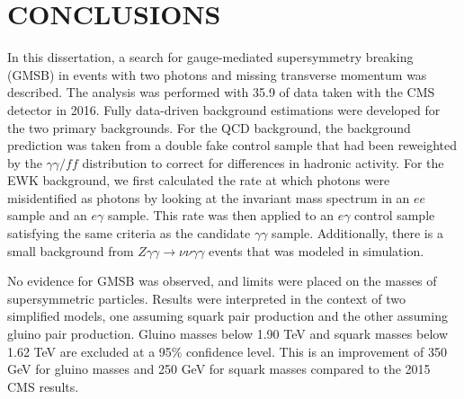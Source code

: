 \chapter{CONCLUSIONS}
\label{chap:Conclusions}

In this dissertation, a search for gauge-mediated supersymmetry breaking (GMSB) in events with two photons and missing transverse momentum was described. The analysis was performed with 35.9 \fbinv of data taken with the CMS detector in 2016. Fully data-driven background estimations were developed for the two primary backgrounds. For the QCD background, the background prediction was taken from a double fake control sample that had been reweighted by the $\gamma\gamma/ff$ \diempt distribution to correct for differences in hadronic activity. For the EWK background, we first calculated the rate at which photons were misidentified as photons by looking at the invariant mass spectrum in an $ee$ sample and an $e\gamma$ sample. This rate was then applied to an $e\gamma$ control sample satisfying the same criteria as the candidate $\gamma\gamma$ sample. Additionally, there is a small background from $Z\gamma\gamma\rightarrow\nu\nu\gamma\gamma$ events that was modeled in simulation. 

No evidence for GMSB was observed, and limits were placed on the masses of supersymmetric particles. Results were interpreted in the context of two simplified models, one assuming squark pair production and the other assuming gluino pair production. Gluino masses below 1.90 TeV and squark masses below 1.62 TeV are excluded at a 95\% confidence level. This is an improvement of 350 GeV for gluino masses and 250 GeV for squark masses compared to the 2015 CMS results.